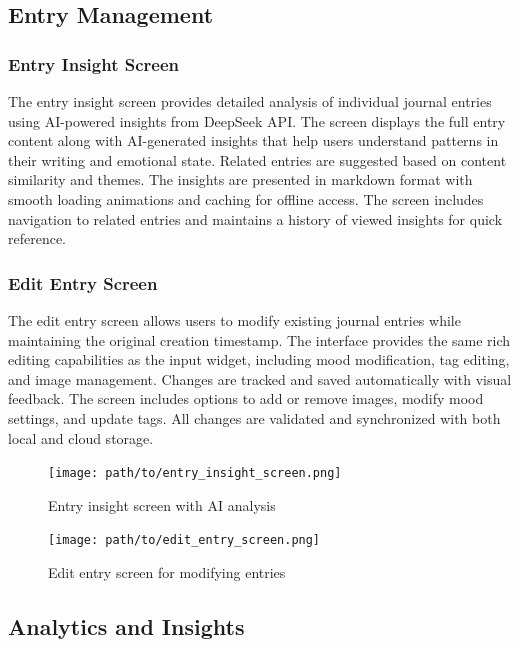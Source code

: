 \subsection{Entry Management}

\subsubsection{Entry Insight Screen}

The entry insight screen provides detailed analysis of individual journal entries using AI-powered insights from DeepSeek API. The screen displays the full entry content along with AI-generated insights that help users understand patterns in their writing and emotional state. Related entries are suggested based on content similarity and themes. The insights are presented in markdown format with smooth loading animations and caching for offline access. The screen includes navigation to related entries and maintains a history of viewed insights for quick reference.

\subsubsection{Edit Entry Screen}

The edit entry screen allows users to modify existing journal entries while maintaining the original creation timestamp. The interface provides the same rich editing capabilities as the input widget, including mood modification, tag editing, and image management. Changes are tracked and saved automatically with visual feedback. The screen includes options to add or remove images, modify mood settings, and update tags. All changes are validated and synchronized with both local and cloud storage.

\begin{figure}[H]
\centering
\begin{minipage}{0.45\textwidth}
\centering
\texttt{[image: path/to/entry\_insight\_screen.png]}
\caption{Entry insight screen with AI analysis}
\label{fig:entry-insight-screen}
\end{minipage}
\hfill
\begin{minipage}{0.45\textwidth}
\centering
\texttt{[image: path/to/edit\_entry\_screen.png]}
\caption{Edit entry screen for modifying entries}
\label{fig:edit-entry-screen}
\end{minipage}
\end{figure}

\subsection{Analytics and Insights}

